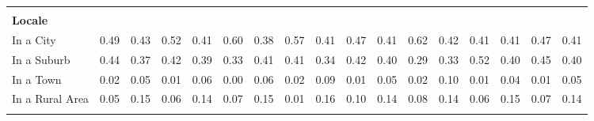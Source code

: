\begin{tabular*}{\linewidth}{@{\extracolsep{\fill} } lcccccccccccccccc}
&&&&&&&&&&&&&&&&\\%
\multicolumn{17}{l}{\bfseries Locale}\\%
\hspace{0.2cm}In a City&0.49&0.43&0.52&0.41&0.60&0.38&0.57&0.41&0.47&0.41&0.62&0.42&0.41&0.41&0.47&0.41\\%
\hspace{0.2cm}In a Suburb&0.44&0.37&0.42&0.39&0.33&0.41&0.41&0.34&0.42&0.40&0.29&0.33&0.52&0.40&0.45&0.40\\%
\hspace{0.2cm}In a Town&0.02&0.05&0.01&0.06&0.00&0.06&0.02&0.09&0.01&0.05&0.02&0.10&0.01&0.04&0.01&0.05\\%
\hspace{0.2cm}In a Rural Area&0.05&0.15&0.06&0.14&0.07&0.15&0.01&0.16&0.10&0.14&0.08&0.14&0.06&0.15&0.07&0.14\\%
&&&&&&&&&&&&&&&&\\%
\hline%
\end{tabular*}